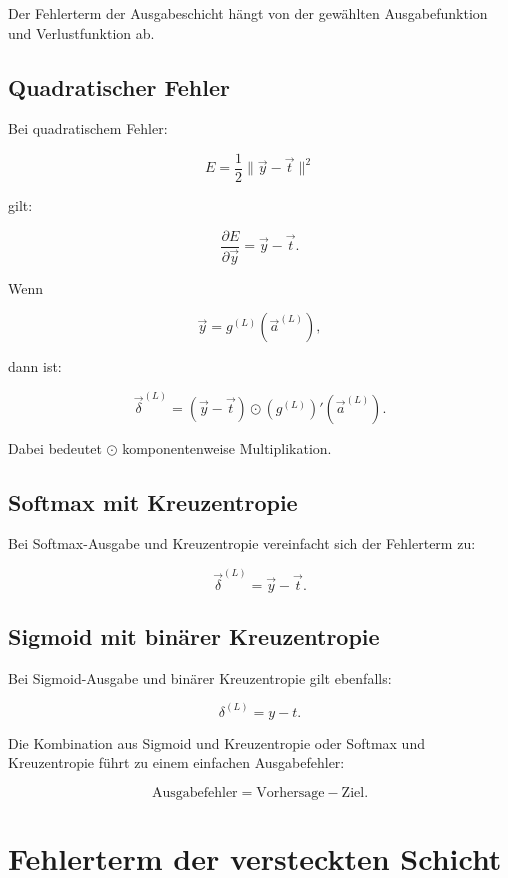 Der Fehlerterm der Ausgabeschicht hängt von der gewählten Ausgabefunktion und Verlustfunktion ab.

\subsection{Quadratischer Fehler}

Bei quadratischem Fehler:

\[
    E
    =
    \frac{1}{2}
    \|\vec{y}-\vec{t}\|^2
\]

gilt:

\[
    \frac{\partial E}{\partial \vec{y}}
    =
    \vec{y}-\vec{t}.
\]

Wenn

\[
    \vec{y}
    =
    g^{(L)}(\vec{a}^{(L)}),
\]

dann ist:

\[
    \vec{\delta}^{(L)}
    =
    (\vec{y}-\vec{t})
    \odot
    (g^{(L)})'(\vec{a}^{(L)}).
\]

Dabei bedeutet \(\odot\) komponentenweise Multiplikation.

\subsection{Softmax mit Kreuzentropie}

Bei Softmax-Ausgabe und Kreuzentropie vereinfacht sich der Fehlerterm zu:

\[
    \vec{\delta}^{(L)}
    =
    \vec{y}-\vec{t}.
\]

\subsection{Sigmoid mit binärer Kreuzentropie}

Bei Sigmoid-Ausgabe und binärer Kreuzentropie gilt ebenfalls:

\[
    \delta^{(L)}
    =
    y-t.
\]

\begin{conceptbox}
Die Kombination aus Sigmoid und Kreuzentropie oder Softmax und Kreuzentropie führt zu einem einfachen Ausgabefehler:

\[
    \text{Ausgabefehler}
    =
    \text{Vorhersage}
    -
    \text{Ziel}.
\]
\end{conceptbox}

\section{Fehlerterm der versteckten Schicht}

